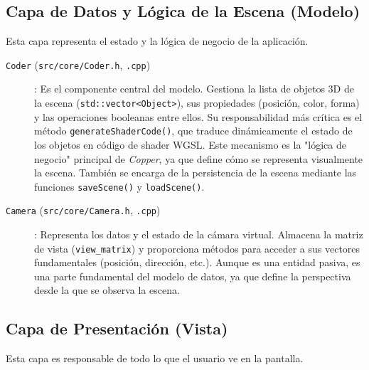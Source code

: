 \subsection{Capa de Datos y Lógica de la Escena (Modelo)}

Esta capa representa el estado y la lógica de negocio de la aplicación.

\begin{description}
    \item[\texttt{Coder} (\texttt{src/core/Coder.h}, \texttt{.cpp})]: Es el componente central del modelo. Gestiona la lista de objetos 3D de la escena (\texttt{std::vector<Object>}), sus propiedades (posición, color, forma) y las operaciones booleanas entre ellos. Su responsabilidad más crítica es el método \texttt{generateShaderCode()}, que traduce dinámicamente el estado de los objetos en código de shader WGSL. Este mecanismo es la "lógica de negocio" principal de \textit{Copper}, ya que define cómo se representa visualmente la escena. También se encarga de la persistencia de la escena mediante las funciones \texttt{saveScene()} y \texttt{loadScene()}.

    \item[\texttt{Camera} (\texttt{src/core/Camera.h}, \texttt{.cpp})]: Representa los datos y el estado de la cámara virtual. Almacena la matriz de vista (\texttt{view\_matrix}) y proporciona métodos para acceder a sus vectores fundamentales (posición, dirección, etc.). Aunque es una entidad pasiva, es una parte fundamental del modelo de datos, ya que define la perspectiva desde la que se observa la escena.
\end{description}

\subsection{Capa de Presentación (Vista)}

Esta capa es responsable de todo lo que el usuario ve en la pantalla.

